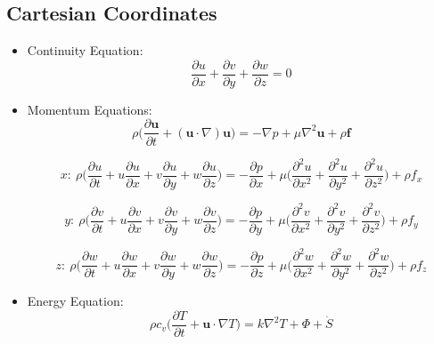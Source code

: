 \documentclass{article}
\begin{document}
        
    \subsection{Cartesian Coordinates} 
        \begin{itemize}
            \item Continuity Equation:
            \[\frac{\partial u}{\partial x} + \frac{\partial v}{\partial y} + \frac{\partial w}{\partial z}=0\]
            
            \item Momentum Equations:
            \[\rho \bigg(\frac{\partial \mathbf{u}}{\partial t} + (\mathbf{u}\cdot \nabla)\mathbf{u} \bigg) = -\nabla p + \mu \nabla^{2}\mathbf{u} + \rho \mathbf{f}\]
            
            \[x: \ \rho \bigg(\frac{\partial u}{\partial t} + u \frac{\partial u}{\partial x} + v\frac{\partial u}{\partial y} + w\frac{\partial u}{\partial z} \bigg) = -\frac{\partial p}{\partial x} + \mu \bigg(\frac{\partial^{2} u}{\partial x^{2}} + \frac{\partial^{2} u}{\partial y^{2}} + \frac{\partial^{2} u}{\partial z^{2}}\bigg) + \rho f_{x}\]
            
            \[y: \ \rho \bigg(\frac{\partial v}{\partial t} + u \frac{\partial v}{\partial x} + v\frac{\partial v}{\partial y} + w\frac{\partial v}{\partial z} \bigg) = -\frac{\partial p}{\partial y} + \mu \bigg(\frac{\partial^{2} v}{\partial x^{2}} + \frac{\partial^{2} v}{\partial y^{2}} + \frac{\partial^{2} v}{\partial z^{2}}\bigg) + \rho f_{y}\]
            
            \[z: \ \rho \bigg(\frac{\partial w}{\partial t} + u \frac{\partial w}{\partial x} + v\frac{\partial w}{\partial y} + w\frac{\partial w}{\partial z} \bigg) = -\frac{\partial p}{\partial z} + \mu \bigg(\frac{\partial^{2} w}{\partial x^{2}} + \frac{\partial^{2} w}{\partial y^{2}} + \frac{\partial^{2} w}{\partial z^{2}}\bigg) + \rho f_{z}\]
            
            \item Energy Equation:
            \[\rho c_{v} \bigg(\frac{\partial T}{\partial t} + \mathbf{u}\cdot \nabla T \bigg) = k\nabla^{2}T + \Phi + \dot{S} \]
        \end{itemize}
    
\end{document}
